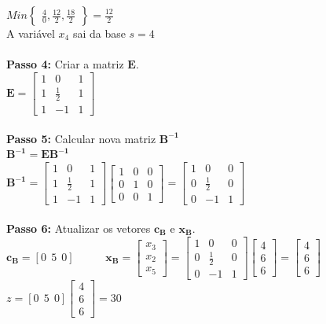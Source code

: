 {\begin{minipage}[l]{14,2cm}
$Min\begin{Bmatrix}
\frac{4}{0},\frac{12}{2},\frac{18}{2}
\end{Bmatrix} = \frac{12}{2}$\\
A variável $x_{4}$ sai da base $s=4$
\\ \\
\textbf{Passo 4:} Criar a matriz $\mathbf{E}$.
\\$\mathbf{E}=\begin{bmatrix}
1 & 0 & 1\\
1 & \frac{1}{2} & 1\\
1 & -1 & 1
\end{bmatrix}$
\\ \\
\textbf{Passo 5:} Calcular nova matriz $\mathbf{B^{-1}}$ 
\\$\mathbf{B^{-1}} = \mathbf{EB^{-1}}$
\\$\mathbf{B^{-1}} = \begin{bmatrix}
1 & 0 & 1\\
1 & \frac{1}{2} & 1\\
1 & -1 & 1
\end{bmatrix}\begin{bmatrix}
1 & 0 & 0 \\
0 & 1 & 0 \\
0 & 0 & 1
\end{bmatrix}=\begin{bmatrix}
1 & 0 & 0 \\
0 & \frac{1}{2} & 0 \\
0 & -1 & 1
\end{bmatrix}$
\\ \\
\textbf{Passo 6:} Atualizar os vetores $\mathbf{c{_B}}$ e $\mathbf{x{_B}}$.
\\$\mathbf{c{_B}}=[0\ \ 5\ \ 0]$
 \ \ \ \ \ 
$\mathbf{x{_B}}=\begin{bmatrix}
x{_3} \\
x{_2} \\
x{_5} 
\end{bmatrix} = \begin{bmatrix}
1 & 0 & 0 \\
0 & \frac{1}{2} & 0 \\
0 & -1 & 1
\end{bmatrix}\begin{bmatrix}
4 \\
6 \\
6 
\end{bmatrix} = \begin{bmatrix}
4 \\
6 \\
6 
\end{bmatrix}$
 \ \ \ \ \ $z = [0\ \ 5\ \ 0]\begin{bmatrix}
4 \\
6 \\
6 
\end{bmatrix} = 30$
\end{minipage}
}

